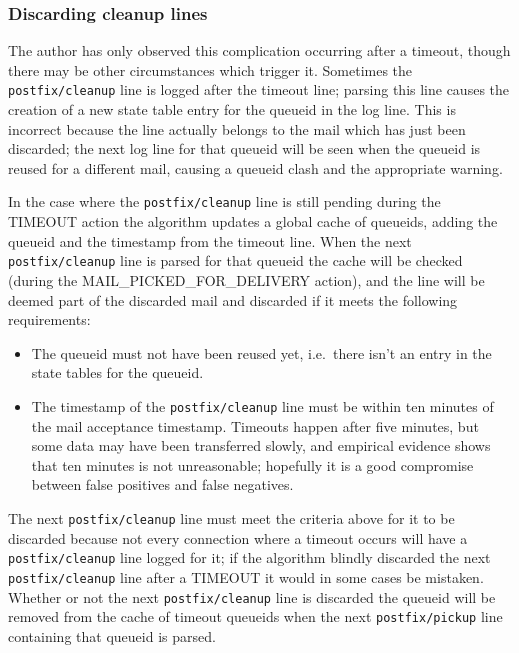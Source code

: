 \documentclass[a4paper,12pt,draft]{article}
\newcommand{\daemon}[1]{%
    \texttt{postfix/#1}%
}
\begin{document}
\subsubsection{Discarding cleanup lines}

\label{discarding cleanup lines}

The author has only observed this complication occurring after a timeout,
though there may be other circumstances which trigger it.  Sometimes the
\daemon{cleanup} line is logged after the timeout line; parsing this line
causes the creation of a new state table entry for the queueid in the log
line.  This is incorrect because the line actually belongs to the mail
which has just been discarded; the next log line for that queueid will be
seen when the queueid is reused for a different mail, causing a queueid
clash and the appropriate warning.

In the case where the \daemon{cleanup} line is still pending during the
TIMEOUT action the algorithm updates a global cache of queueids, adding the
queueid and the timestamp from the timeout line.  When the next
\daemon{cleanup} line is parsed for that queueid the cache will be checked
(during the MAIL\_PICKED\_FOR\_DELIVERY action),
and the line will be deemed part of the discarded mail and discarded if it
meets the following requirements:

\begin{itemize}

    \item The queueid must not have been reused yet, i.e.\ there isn't an
        entry in the state tables for the queueid.

    \item The timestamp of the \daemon{cleanup} line must be within ten
        minutes of the mail acceptance timestamp.  Timeouts happen after
        five minutes, but some data may have been transferred slowly, and
        empirical evidence shows that ten minutes is not unreasonable;
        hopefully it is a good compromise between false positives and false
        negatives.

\end{itemize}

The next \daemon{cleanup} line must meet the criteria above for it to be
discarded because not every connection where a timeout occurs will have a
\daemon{cleanup} line logged for it; if the algorithm blindly discarded the
next \daemon{cleanup} line after a TIMEOUT it would in some cases be
mistaken.  Whether or not the next \daemon{cleanup} line is discarded the
queueid will be removed from the cache of timeout queueids when the next
\daemon{pickup} line containing that queueid is parsed.
\end{document}
